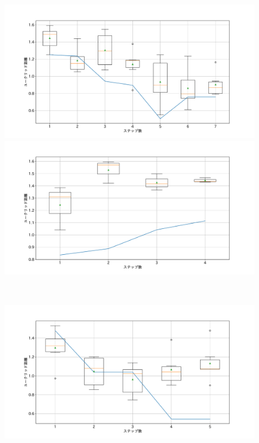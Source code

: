\begin{figure}[h]
 \begin{minipage}[b]{0.48\linewidth}
  \centering
  \includegraphics[scale=0.15]{./imgs/gaChange/cake1_1.pdf}
 \end{minipage}
 \begin{minipage}[b]{0.48\linewidth}
  \centering
  \includegraphics[scale=0.15]{./imgs/gaChange/cake2_1.pdf}
 \end{minipage}\\
 \begin{minipage}[b]{0.48\linewidth}
  \centering
  \includegraphics[scale=0.15]{./imgs/gaChange/cake1_2.pdf}

\end{minipage}
\end{figure}
